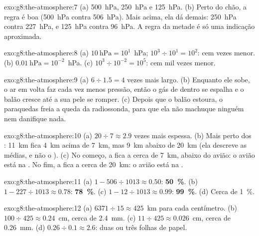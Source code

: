 \begin{solution}{exo:g8:the-atmosphere:7}
(a) \qty{500}{hPa}, \qty{250}{hPa} e \qty{125}{hPa}. (b) Perto do chão, a
regra é boa (\qty{500}{hPa} contra \qty{506}{hPa}). Mais acima, ela dá
demais: \qty{250}{hPa} contra \qty{227}{hPa}, e \qty{125}{hPa} contra
\qty{96}{hPa}. A regra da metade é só uma indicação aproximada.
\end{solution}

\begin{solution}{exo:g8:the-atmosphere:8}
(a) $10~\text{hPa} = 10^1$~hPa; $10^3 \div 10^1 = 10^2$: cem vezes
menor. (b) $0.01~\text{hPa} = 10^{-2}$~hPa. (c) $10^3 \div 10^{-2} =
10^5$: cem mil vezes menor.
\end{solution}

\begin{solution}{exo:g8:the-atmosphere:9}
(a) $6 \div 1.5 = 4$ vezes mais largo. (b) Enquanto ele sobe, o ar em
volta faz cada vez menos pressão, então o gás de dentro se espalha e o
balão cresce até a sua pele se romper. (c) Depois que o balão estoura, o
paraquedas freia a queda da radiossonda, para que ela não machuque
ninguém nem danifique nada.
\end{solution}

\begin{solution}{exo:g8:the-atmosphere:10}
(a) $20 \div 7 \approx 2.9$ vezes mais espessa. (b) Mais perto dos :
\qty{11}{km} fica \qty{4}{km} acima de \qty{7}{km}, mas \qty{9}{km} abaixo de \qty{20}{km} (ela descreve as  médias, e não o ).
(c) No começo, a  fica a cerca de \qty{7}{km}, abaixo do avião:
o avião está na . No fim, a  fica a cerca de
\qty{20}{km}: o avião está na .
\end{solution}

\begin{solution}{exo:g8:the-atmosphere:11}
(a) $1 - 506 \div 1013 \approx 0.50$: \textbf{50~\%}. (b) $1 - 227 \div
1013 \approx 0.78$: \textbf{78~\%}. (c) $1 - 12 \div 1013 \approx 0.99$:
\textbf{99~\%}. (d) Cerca de 1~\%.
\end{solution}

\begin{solution}{exo:g8:the-atmosphere:12}
(a) $6371 \div 15 \approx 425$~km para cada centímetro. (b) $100 \div 425
\approx 0.24$~cm, cerca de \qty{2.4}{mm}. (c) $11 \div 425 \approx
0.026$~cm, cerca de \qty{0.26}{mm}. (d) $0.26 \div 0.1 \approx 2.6$: duas
ou três folhas de papel.
\end{solution}

